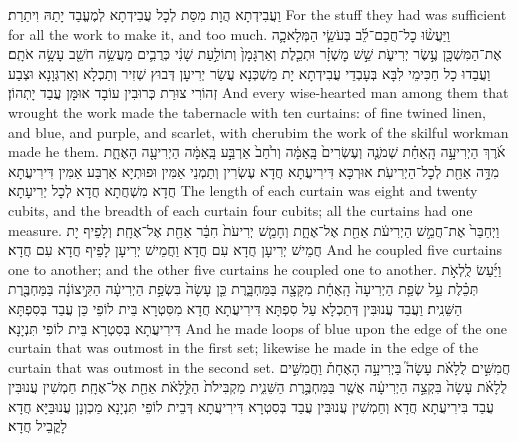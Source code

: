 {{וַעֲבִידְתָא הֲוָת מִסַּת לְכָל עֲבִידְתָא לְמֶעֱבַד יָתַהּ וִיתַרַת׃}
{For the stuff they had was sufficient for all the work to make it, and too much.}{}
{וַיַּעֲשׂ֨וּ כׇל־חֲכַם־לֵ֜ב בְּעֹשֵׂ֧י הַמְּלָאכָ֛ה אֶת־הַמִּשְׁכָּ֖ן עֶ֣שֶׂר יְרִיעֹ֑ת שֵׁ֣שׁ מׇשְׁזָ֗ר וּתְכֵ֤לֶת וְאַרְגָּמָן֙ וְתוֹלַ֣עַת שָׁנִ֔י כְּרֻבִ֛ים מַעֲשֵׂ֥ה חֹשֵׁ֖ב עָשָׂ֥ה אֹתָֽם׃}
{וַעֲבַדוּ כָל חַכִּימֵי לִבָּא בְּעָבְדֵי עֲבִידְתָא יָת מַשְׁכְּנָא עֲשַׂר יְרִיעָן דְּבוּץ שְׁזִיר וְתַכְלָא וְאַרְגְּוָנָא וּצְבַע זְהוֹרִי צוּרַת כְּרוּבִין עוֹבָד אוּמָּן עֲבַד יָתְהוֹן׃}
{And every wise-hearted man among them that wrought the work made the tabernacle with ten curtains: of fine twined linen, and blue, and purple, and scarlet, with cherubim the work of the skilful workman made he them.}{}
{אֹ֜רֶךְ הַיְרִיעָ֣ה הָֽאַחַ֗ת שְׁמֹנֶ֤ה וְעֶשְׂרִים֙ בָּֽאַמָּ֔ה וְרֹ֙חַב֙ אַרְבַּ֣ע בָּֽאַמָּ֔ה הַיְרִיעָ֖ה הָאֶחָ֑ת מִדָּ֥ה אַחַ֖ת לְכׇל־הַיְרִיעֹֽת׃}
{אוּרְכָּא דִּירִיעֲתָא חֲדָא עֶשְׂרִין וְתַמְנֵי אַמִּין וּפוּתְיָא אַרְבַּע אַמִּין דִּירִיעֲתָא חֲדָא מִשְׁחֲתָא חֲדָא לְכָל יְרִיעָתָא׃}
{The length of each curtain was eight and twenty cubits, and the breadth of each curtain four cubits; all the curtains had one measure.}{}
{וַיְחַבֵּר֙ אֶת־חֲמֵ֣שׁ הַיְרִיעֹ֔ת אַחַ֖ת אֶל־אֶחָ֑ת וְחָמֵ֤שׁ יְרִיעֹת֙ חִבַּ֔ר אַחַ֖ת אֶל־אֶחָֽת׃}
{וְלָפֵיף יָת חֲמֵישׁ יְרִיעָן חֲדָא עִם חֲדָא וַחֲמֵישׁ יְרִיעָן לָפֵיף חֲדָא עִם חֲדָא׃}
{And he coupled five curtains one to another; and the other five curtains he coupled one to another.}{}
{וַיַּ֜עַשׂ לֻֽלְאֹ֣ת תְּכֵ֗לֶת עַ֣ל שְׂפַ֤ת הַיְרִיעָה֙ הָֽאֶחָ֔ת מִקָּצָ֖ה בַּמַּחְבָּ֑רֶת כֵּ֤ן עָשָׂה֙ בִּשְׂפַ֣ת הַיְרִיעָ֔ה הַקִּ֣יצוֹנָ֔ה בַּמַּחְבֶּ֖רֶת הַשֵּׁנִֽית׃}
{וַעֲבַד עֲנוּבִּין דְּתַכְלָא עַל סִפְתָּא דִּירִיעֲתָא חֲדָא מִסִּטְרָא בֵּית לוֹפֵי כֵּן עֲבַד בְּסִפְתָּא דִּירִיעֲתָא בְּסִטְרָא בֵּית לוֹפִי תִּנְיָנָא׃}
{And he made loops of blue upon the edge of the one curtain that was outmost in the first set; likewise he made in the edge of the curtain that was outmost in the second set.}{}
{חֲמִשִּׁ֣ים לֻלָאֹ֗ת עָשָׂה֮ בַּיְרִיעָ֣ה הָאֶחָת֒ וַחֲמִשִּׁ֣ים לֻלָאֹ֗ת עָשָׂה֙ בִּקְצֵ֣ה הַיְרִיעָ֔ה אֲשֶׁ֖ר בַּמַּחְבֶּ֣רֶת הַשֵּׁנִ֑ית מַקְבִּילֹת֙ הַלֻּ֣לָאֹ֔ת אַחַ֖ת אֶל־אֶחָֽת׃}
{חַמְשִׁין עֲנוּבִּין עֲבַד בִּירִיעֲתָא חֲדָא וְחַמְשִׁין עֲנוּבִּין עֲבַד בְּסִטְרָא דִּירִיעֲתָא דְּבֵית לוֹפֵי תִּנְיָנָא מַכְוְנָן עֲנוּבַּיָּא חֲדָא לָקֳבֵיל חֲדָא׃}
}
